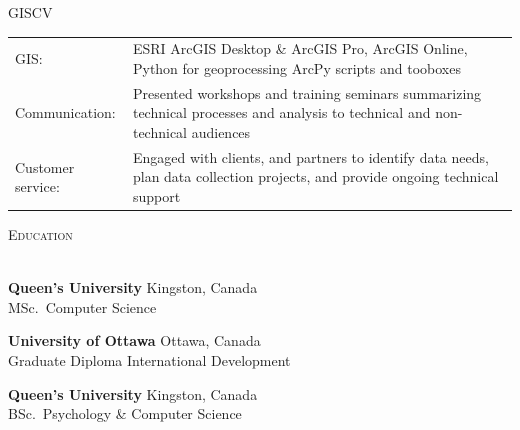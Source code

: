 \documentclass[letterpaper]{article}
\newcommand{\lineunder} {
        \vspace*{-8pt} \\
        \hspace*{-18pt} \hrulefill \\
    }
\newcommand{\header} [1] {
        \vspace{10pt}
        {\hspace*{-18pt}\vspace*{6pt} \textsc{#1}}
        \vspace*{-6pt} \lineunder
        \vspace{3pt}
    }
\newcommand{\university}[3]{
        \textbf{#1}  %
        \hfill #2\\  %
        #3\\         %
        \vspace{2mm}
    }
\newenvironment{skillslist}
        {
            \begin{tabular}[t]{ l L{5.17in} }
        }{
            \end{tabular}
        }
\begin{document}
    \begin{taggedblock}{GISCV}
        \begin{skillslist}
            GIS:& 
                ESRI ArcGIS Desktop \& ArcGIS Pro, ArcGIS Online, 
                Python for geoprocessing ArcPy scripts and tooboxes
                \\
            Communication: &
                Presented workshops and training seminars summarizing technical
                processes and analysis to technical and non-technical audiences
                \\
            Customer service: &
                Engaged with clients, and partners to identify data needs, plan data
                collection projects, and provide ongoing technical support
                \\
        \end{skillslist}
    \end{taggedblock}



\header{Education}
    \university
        {Queen's University}
        {Kingston, Canada}
        {MSc.~Computer Science}

    \university
        {University of Ottawa}
        {Ottawa, Canada}
        {Graduate Diploma International Development}

    \university
        {Queen's University}
        {Kingston, Canada}
        {BSc.~Psychology \& Computer Science}
\end{document}
